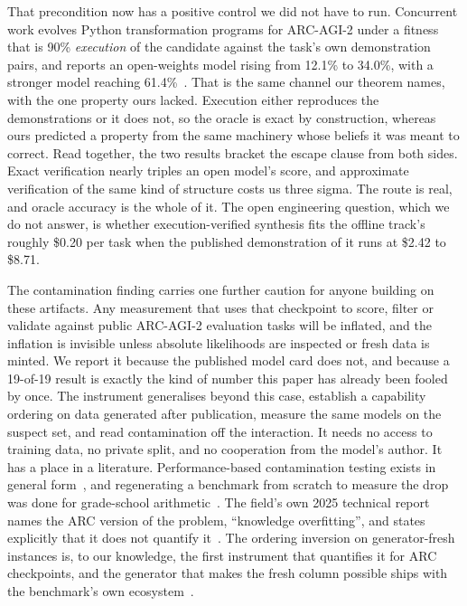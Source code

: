 \documentclass[11pt]{article}
\begin{document}
That precondition now has a positive control we did not have to run. Concurrent work evolves Python
transformation programs for ARC-AGI-2 under a fitness that is 90\% \emph{execution} of the candidate
against the task's own demonstration pairs, and reports an open-weights model rising from 12.1\% to
34.0\%, with a stronger model reaching 61.4\%~\cite{imbue2026}. That is the same channel our theorem
names, with the one property ours lacked. Execution either reproduces the demonstrations or it does
not, so the oracle is exact by construction, whereas ours predicted a property from the same
machinery whose beliefs it was meant to correct. Read together, the two results bracket the escape
clause from both sides. Exact verification nearly triples an open model's score, and approximate
verification of the same kind of structure costs us three sigma. The route is real, and oracle
accuracy is the whole of it. The open engineering question, which we do not answer, is whether
execution-verified synthesis fits the offline track's roughly \$0.20 per task when the published
demonstration of it runs at \$2.42 to \$8.71.

The contamination finding carries one further caution for anyone building on these artifacts. Any
measurement that uses that checkpoint to score, filter or validate against public ARC-AGI-2 evaluation
tasks will be inflated, and the inflation is invisible unless absolute likelihoods are inspected or
fresh data is minted. We report it because the published model card does not, and because a 19-of-19
result is exactly the kind of number this paper has already been fooled by once. The instrument
generalises beyond this case, establish a capability ordering on data generated after publication,
measure the same models on the suspect set, and read contamination off the interaction. It needs no
access to training data, no private split, and no cooperation from the model's author. It has a
place in a literature. Performance-based contamination testing exists in general
form~\cite{constat}, and regenerating a benchmark from scratch to measure the drop was done for
grade-school arithmetic~\cite{gsm1k}. The field's own 2025 technical report names the ARC version of
the problem, ``knowledge overfitting'', and states explicitly that it does not quantify
it~\cite{arc2025}. The ordering inversion on generator-fresh instances is, to our knowledge, the
first instrument that quantifies it for ARC checkpoints, and the generator that makes the fresh
column possible ships with the benchmark's own ecosystem~\cite{rearc}.
\end{document}
